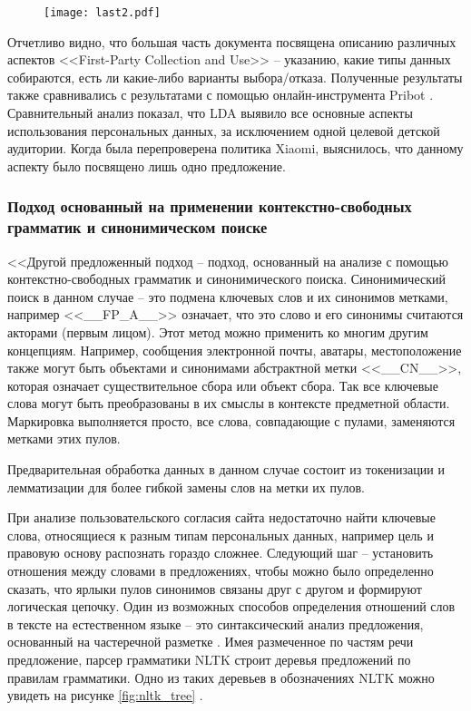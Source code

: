 \documentclass[../main]{subfiles}
\begin{document}
\begin{figure}[H]
    \centering
    {\texttt{[image: last2.pdf]}}
    \vspace{-\baselineskip}
\end{figure}

Отчетливо видно, что большая часть документа посвящена описанию различных аспектов <<First-Party Collection and Use>> – указанию, какие типы данных собираются, есть ли какие-либо варианты выбора/отказа. Полученные результаты также сравнивались с результатами \cite{MDPI7} с помощью онлайн-инструмента Pribot \cite{Polisis}. Сравнительный анализ показал, что LDA выявило все основные аспекты использования персональных данных, за исключением одной целевой детской аудитории. Когда была перепроверена политика Xiaomi, выяснилось, что данному аспекту было посвящено лишь одно предложение.

\subsubsection{Подход основанный на применении контекстно-свободных грамматик и синонимическом поиске}

<<Другой предложенный подход -- подход, основанный на анализе с помощью контекстно-свободных грамматик и синонимического поиска. Синонимический поиск в данном случае -- это подмена ключевых слов и их синонимов метками, например <<\_\_FP\_A\_\_>> означает, что это слово и его синонимы считаются акторами (первым лицом). Этот метод можно применить ко многим другим концепциям. Например, сообщения электронной почты, аватары, местоположение также могут быть объектами и синонимами абстрактной метки <<\_\_CN\_\_>>, которая означает существительное сбора или объект сбора. Так все ключевые слова могут быть преобразованы в их смыслы в контексте предметной области. Маркировка выполняется просто, все слова, совпадающие с пулами, заменяются метками этих пулов.

Предварительная обработка данных в данном случае состоит из токенизации и лемматизации для более гибкой замены слов на метки их пулов.

При анализе пользовательского согласия сайта недостаточно найти ключевые слова, относящиеся к разным типам персональных данных, например цель и правовую основу распознать гораздо сложнее. Следующий шаг -- установить отношения между словами в предложениях, чтобы можно было определенно сказать, что ярлыки пулов синонимов связаны друг с другом и формируют логическая цепочку. Один из возможных способов определения отношений слов в тексте на естественном языке -- это синтаксический анализ предложения, основанный на частеречной разметке \cite{POS}. Имея размеченное по частям речи предложение, парсер грамматики NLTK \cite{NLTK} строит деревья предложений по правилам грамматики. Одно из таких деревьев в обозначениях NLTK можно увидеть на рисунке \ref{fig:nltk_tree} \cite{NLTK}.
\end{document}
